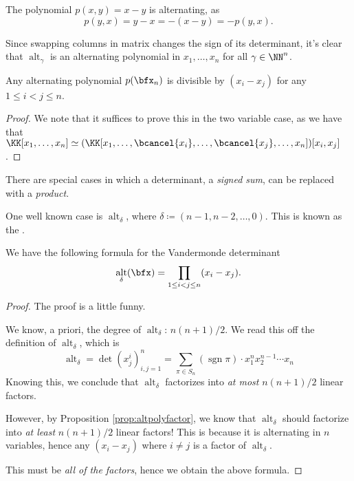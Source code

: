 \documentclass{article}
\DeclareMathOperator{\sgn}{sgn}
\DeclareMathOperator{\alt}{alt}
\begin{document}
\begin{example}
    The polynomial $p(x,y) = x-y$ is alternating, as
    \[
        p(y,x) = y-x = -(x-y) = -p(y,x).
    \]
\end{example}

Since swapping columns in matrix changes the sign of its determinant, it's clear that $\alt_\gamma$ is an alternating polynomial in $x_1,\ldots,x_n$ for all $\gamma \in \NN^n$.

\begin{proposition} \label{prop:altpolyfactor}
    Any alternating polynomial $p(\bfx_n)$ is divisible by $(x_i - x_j)$ for any $1 \leq i < j \leq n$.
\end{proposition}

\begin{proof}
    We note that it suffices to prove this in the two variable case, as we have that $\KK[x_1,\ldots,x_n] \simeq (\KK[x_1,\ldots,\bcancel{x_i},\ldots,\bcancel{x_j},\ldots,x_n])[x_i,x_j]$.
\end{proof}

There are special cases in which a determinant, a \textit{signed sum}, can be replaced with a \textit{product}.

One well known case is $\alt_\delta$, where $\delta \coloneq (n-1,n-2,\ldots,0)$.
This is known as the .

\begin{theorem}
    We have the following formula for the Vandermonde determinant
    \[
        \alt_\delta(\bfx) 
        = 
        \prod_{1 \leq i < j \leq n} (x_i-x_j).
    \]
\end{theorem}

\begin{proof}
    The proof is a little funny.

    We know, a priori, the degree of $\alt_\delta$: $n(n+1)/2$. We read this off the definition of $\alt_\delta$, which is
    \[
        \alt_\delta = \det\left(x_j^{i}\right)_{i,j=1}^n = \sum_{\pi \in S_n} (\sgn \pi) \cdot x_1^nx_2^{n-1}\cdots x_n
    \]
    Knowing this, we conclude that $\alt_\delta$ factorizes into \textit{at most} $n(n+1)/2$ linear factors.

    However, by Proposition \ref{prop:altpolyfactor}, we know that $\alt_\delta$ should factorize into \textit{at least} $n(n+1)/2$ linear factors!
    This is because it is alternating in $n$ variables, hence any $(x_i - x_j)$ where $i \neq j$ is a factor of $\alt_\delta$.

    This must be \textit{all of the factors}, hence we obtain the above formula.
\end{proof}
    
\end{document}
